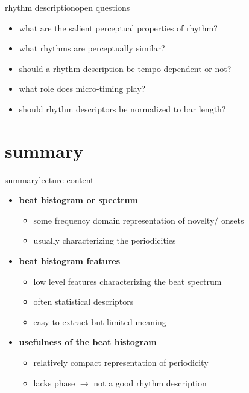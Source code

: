             \begin{frame}{rhythm description}{open questions}
                \begin{itemize}
                    \item   what are the salient perceptual properties of rhythm?
                    \smallskip
                    \item   what rhythms are perceptually similar?
                    \smallskip
                    \item   should a rhythm description be tempo dependent or not?
                    \smallskip
                    \item   what role does micro-timing play?
                    \smallskip
                    \item   should rhythm descriptors be normalized to bar length?
                \end{itemize}
            \end{frame}

    
    \section{summary}
        \begin{frame}{summary}{lecture content}
            \begin{itemize}
                \item   \textbf{beat histogram or spectrum}
                    \begin{itemize}
                        \item   some frequency domain representation of  novelty/ onsets
                        \item   usually characterizing the periodicities
                    \end{itemize}
                \bigskip
                \item   \textbf{beat histogram features}
                    \begin{itemize}
                        \item   low level features characterizing the beat spectrum
                        \item   often statistical descriptors
                        \item   easy to extract but limited meaning
                    \end{itemize}
                \bigskip
                \item   \textbf{usefulness of the beat histogram}
                    \begin{itemize}
                        \item   relatively compact representation of periodicity
                        \item   lacks phase $\rightarrow$ not a good rhythm description
                    \end{itemize}
            \end{itemize}
        \end{frame}

